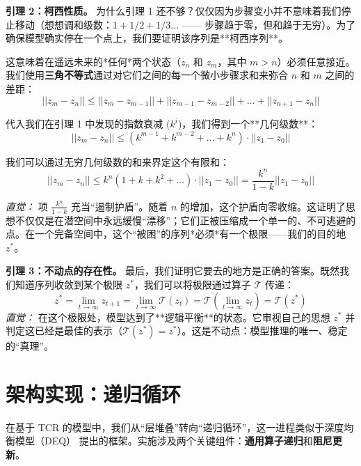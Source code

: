 \documentclass[11pt, a4paper]{article}
\begin{document}
\textbf{引理 2：柯西性质。}
为什么引理 1 还不够？仅仅因为步骤变小并不意味着我们停止移动（想想调和级数：$1 + 1/2 + 1/3 \dots$ —— 步骤趋于零，但和趋于无穷）。为了确保模型确实停在一个点上，我们要证明该序列是**柯西序列**。

这意味着在遥远未来的*任何*两个状态（$z_n$ 和 $z_m$，其中 $m > n$）必须任意接近。我们使用\textbf{三角不等式}通过对它们之间的每一个微小步骤求和来弥合 $n$ 和 $m$ 之间的差距：
\begin{equation}
 ||z_m - z_n|| \le ||z_m - z_{m-1}|| + ||z_{m-1} - z_{m-2}|| + \dots + ||z_{n+1} - z_n|| 
\end{equation}

代入我们在引理 1 中发现的指数衰减 ($k^i$)，我们得到一个**几何级数**：
\begin{equation}
 ||z_m - z_n|| \le (k^{m-1} + k^{m-2} + \dots + k^n) \cdot ||z_1 - z_0|| 
\end{equation}

我们可以通过无穷几何级数的和来界定这个有限和：
\begin{equation}
 ||z_m - z_n|| \le k^n(1 + k + k^2 + \dots) \cdot ||z_1 - z_0|| = \frac{k^n}{1-k} ||z_1 - z_0|| 
\end{equation}

\textit{直觉：} 项 $\frac{k^n}{1-k}$ 充当“遏制护盾”。随着 $n$ 的增加，这个护盾向零收缩。这证明了思想不仅仅是在潜空间中永远缓慢“漂移”；它们正被压缩成一个单一的、不可逃避的点。在一个完备空间中，这个“被困”的序列*必须*有一个极限——我们的目的地 $z^*$。

\textbf{引理 3：不动点的存在性。}
最后，我们证明它要去的地方是正确的答案。既然我们知道序列收敛到某个极限 $z^*$，我们可以将极限通过算子 $\mathcal{T}$ 传递：
\begin{equation}
 z^* = \lim_{t \to \infty} z_{t+1} = \lim_{t \to \infty} \mathcal{T}(z_t) = \mathcal{T}(\lim_{t \to \infty} z_t) = \mathcal{T}(z^*) 
\end{equation}
\textit{直觉：} 在这个极限处，模型达到了**逻辑平衡**的状态。它审视自己的思想 $z^*$ 并判定这已经是最佳的表示（$\mathcal{T}(z^*) = z^*$）。这是不动点：模型推理的唯一、稳定的“真理”。

\section{架构实现：递归循环}

在基于 TCR 的模型中，我们从“层堆叠”转向“递归循环”，这一进程类似于深度均衡模型（DEQ） \cite{bai2019deep} 提出的框架。实施涉及两个关键组件：\textbf{通用算子递归}和\textbf{阻尼更新}。
\end{document}
